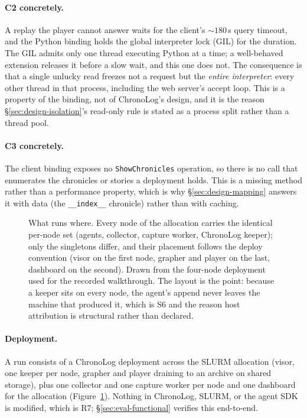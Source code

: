 \paragraph{C2 concretely.} A replay the player cannot answer waits for the
client's ${\sim}180$\,s query timeout, and the Python binding holds the
global interpreter lock (GIL) for the duration. The GIL admits only one
thread executing Python at a time; a well-behaved extension releases it
before a slow wait, and this one does not. The consequence is that a single
unlucky read freezes not a request but the \emph{entire interpreter}: every
other thread in that process, including the web server's accept loop. This
is a property of the binding, not of ChronoLog's design, and it is the
reason \S\ref{sec:design-isolation}'s read-only rule is stated as a
process split rather than a thread pool.

\paragraph{C3 concretely.} The client binding exposes no
\texttt{ShowChronicles} operation, so there is no call that enumerates the
chronicles or stories a deployment holds. This is a missing method rather
than a performance property, which is why \S\ref{sec:design-mapping}
answers it with data (the \texttt{\_\_index\_\_} chronicle) rather than with
caching.

\begin{figure}[t]
  \centering
  \resizebox{0.88\linewidth}{!}{}
  \caption[The per-node deployment on a SLURM allocation]{What runs where.
  Every node of the allocation carries the identical per-node set (agents,
  collector, capture worker, ChronoLog keeper); only the singletons differ,
  and their placement follows the deploy convention (visor on the first node,
  grapher and player on the last, dashboard on the second). Drawn from the
  four-node deployment used for the recorded walkthrough. The layout is the
  point: because a keeper sits on every node, the agent's append never leaves
  the machine that produced it, which is S6 and the reason host attribution
  is structural rather than declared.}
  \label{fig:deployment}
\end{figure}

\paragraph{Deployment.} A run consists of a ChronoLog deployment across the
SLURM allocation (visor, one keeper per node, grapher and player draining to
an archive on shared storage), plus one collector and one capture worker per
node and one dashboard for the allocation
(Figure~\ref{fig:deployment}). Nothing in ChronoLog, SLURM, or
the agent SDK is modified, which is R7; \S\ref{sec:eval-functional} verifies
this end-to-end.

